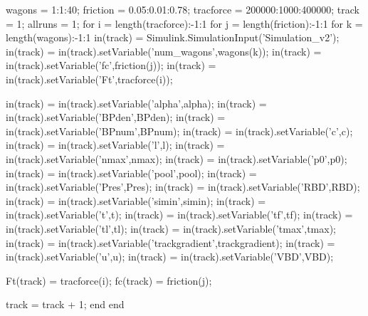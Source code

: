 \bigskip
\begin{python}
wagons = 1:1:40;
friction = 0.05:0.01:0.78;
tracforce = 200000:1000:400000;
track = 1;
allruns = 1;
for i = length(tracforce):-1:1
	for j = length(friction):-1:1
		for k = length(wagons):-1:1
			in(track) = Simulink.SimulationInput('Simulation_v2');
			in(track) = in(track).setVariable('num_wagons',wagons(k));
			in(track) = in(track).setVariable('fc',friction(j));
			in(track) = in(track).setVariable('Ft',tracforce(i));
			
			in(track) = in(track).setVariable('alpha',alpha);
			in(track) = in(track).setVariable('BPden',BPden);
			in(track) = in(track).setVariable('BPnum',BPnum);
			in(track) = in(track).setVariable('c',c);
			in(track) = in(track).setVariable('l',l);
			in(track) = in(track).setVariable('nmax',nmax);
			in(track) = in(track).setVariable('p0',p0);
			in(track) = in(track).setVariable('pool',pool);
			in(track) = in(track).setVariable('Pres',Pres);
			in(track) = in(track).setVariable('RBD',RBD);
			in(track) = in(track).setVariable('simin',simin);
			in(track) = in(track).setVariable('t',t);
			in(track) = in(track).setVariable('tf',tf);
			in(track) = in(track).setVariable('tl',tl);
			in(track) = in(track).setVariable('tmax',tmax);
			in(track) = in(track).setVariable('trackgradient',trackgradient);
			in(track) = in(track).setVariable('u',u);
			in(track) = in(track).setVariable('VBD',VBD);
			
			Ft(track) = tracforce(i);
			fc(track) = friction(j);
	
			track = track + 1;        
		end
	end
\end{python}
\bigskip

